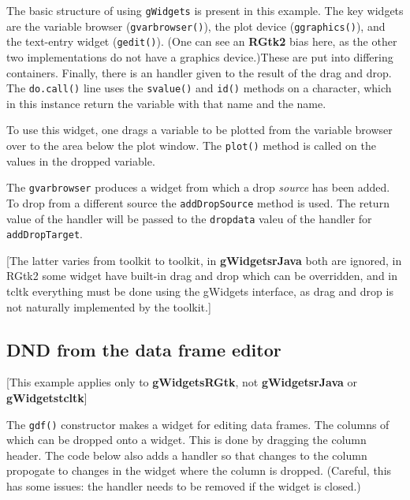 \documentclass[12pt]{article}
\newcommand{\RCode}[1]{\texttt{#1}}
\newcommand{\RFunc}[1]{\texttt{#1()}}
\newcommand{\RPackage}[1]{\textbf{#1}}
\begin{document}
The basic structure of using \RCode{gWidgets} is present in this
example. The key widgets are the variable browser
(\RFunc{gvarbrowser}), the plot device (\RFunc{ggraphics}), and the
text-entry widget (\RFunc{gedit}). (One can see an \RPackage{RGtk2}
bias here, as the other two implementations do not have a graphics
device.)These are put into differing
containers.  Finally, there is an handler given to the result of the
drag and drop. The \RFunc{do.call} line uses the \RFunc{svalue} and
\RFunc{id} methods on a character, which in this instance return the
variable with that name and the name.


To use this widget, one drags a variable to be plotted from the
variable browser over to the area below the plot window. The
\RFunc{plot} method is called on the values in the dropped variable.


The \RCode{gvarbrowser} produces a widget from which a drop
\textit{source} has been added. To drop from a different source the
\RCode{addDropSource} method is used. The return value of the handler
will be passed to the \RCode{dropdata} valeu of the handler for
\RCode{addDropTarget}. 

[The latter varies from toolkit to toolkit, in
\RPackage{gWidgetsrJava} both are ignored, in RGtk2 some widget have
built-in drag and drop which can be overridden, and in tcltk
everything must be done using the gWidgets interface, as drag and drop
is not naturally implemented by the toolkit.]

\subsection{DND from the data frame editor}

[This example applies only to \RPackage{gWidgetsRGtk}, not
\RPackage{gWidgetsrJava} or \RPackage{gWidgetstcltk}]


The \RFunc{gdf} constructor makes a widget for editing data
frames. The columns of which can be dropped onto a widget. This is 
done by dragging the column header. The code below also adds a handler
so that changes to the column propogate to changes in the widget where
the column is dropped. (Careful, this has some issues: the handler needs to
be removed if the widget is closed.)
\end{document}
